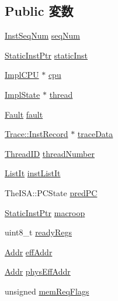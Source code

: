 \subsection*{Public 変数}
\begin{DoxyCompactItemize}
\item 
\hyperlink{inst__seq_8hh_a258d93d98edaedee089435c19ea2ea2e}{InstSeqNum} \hyperlink{classBaseDynInst_af9da73f56d2d0e7fd5009b70c4cf3542}{seqNum}
\item 
\hyperlink{classRefCountingPtr}{StaticInstPtr} \hyperlink{classBaseDynInst_a6799d48af805bf0bd72441e882589a6a}{staticInst}
\item 
\hyperlink{classBaseDynInst_a9792f311b2805cbefb8cb15c1c4a4cf5}{ImplCPU} $\ast$ \hyperlink{classBaseDynInst_af0927cfb92eca43bfa3bfd5ce19af308}{cpu}
\item 
\hyperlink{classBaseDynInst_a767a9d57347239b1c904738bbd7796fa}{ImplState} $\ast$ \hyperlink{classBaseDynInst_a56eb59d7a0af96e35683462934d6d13e}{thread}
\item 
\hyperlink{classRefCountingPtr}{Fault} \hyperlink{classBaseDynInst_a68714ceb74c60ea7ef5dec335bb6c5d7}{fault}
\item 
\hyperlink{classTrace_1_1InstRecord}{Trace::InstRecord} $\ast$ \hyperlink{classBaseDynInst_acbcf6d90551f8d3a598a70caae74d1ef}{traceData}
\item 
\hyperlink{base_2types_8hh_ab39b1a4f9dad884694c7a74ed69e6a6b}{ThreadID} \hyperlink{classBaseDynInst_a892bd80aa2abe0b9cbfdf510d2111772}{threadNumber}
\item 
\hyperlink{classBaseDynInst_a184cb829e22cc656acb41864f68f51ea}{ListIt} \hyperlink{classBaseDynInst_ae774064514a3dc6a8d932c1fb975d37f}{instListIt}
\item 
TheISA::PCState \hyperlink{classBaseDynInst_aebd0b135745958ac2bdfe9deeeb60d9f}{predPC}
\item 
\hyperlink{classRefCountingPtr}{StaticInstPtr} \hyperlink{classBaseDynInst_a239d33ed2aa6ba1b897533642aa107a2}{macroop}
\item 
uint8\_\-t \hyperlink{classBaseDynInst_a98d0c5a64298b2b2d1bb8e99124b0963}{readyRegs}
\item 
\hyperlink{base_2types_8hh_af1bb03d6a4ee096394a6749f0a169232}{Addr} \hyperlink{classBaseDynInst_a1097c58b547d58e4544cbf31fa68a390}{effAddr}
\item 
\hyperlink{base_2types_8hh_af1bb03d6a4ee096394a6749f0a169232}{Addr} \hyperlink{classBaseDynInst_a159ce173047bae421effda8028f07d68}{physEffAddr}
\item 
unsigned \hyperlink{classBaseDynInst_aba29e5174ccb47ac17cc2ff228a8e2af}{memReqFlags}

\end{DoxyCompactItemize}
